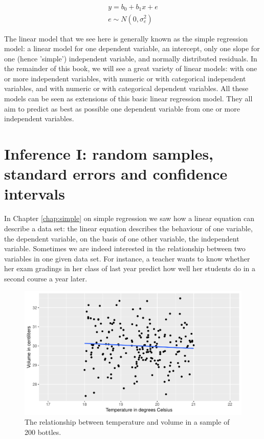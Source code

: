 \documentclass[]{book}\usepackage[]{graphicx}\usepackage[]{color}
\makeatletter
\def\maxwidth{ %
  \ifdim\Gin@nat@width>\linewidth
    \linewidth
  \else
    \Gin@nat@width
  \fi
}
\newenvironment{knitrout}{}{} %
\makeatother
\begin{document}
\begin{eqnarray}
y = b_0 + b_1 x + e \\
e \sim N(0,\sigma^2_e)
\end{eqnarray}


The linear model that we see here is generally known as the simple regression model: a linear model for one dependent variable, an intercept, only one slope for one (hence 'simple')  independent variable,  and normally distributed residuals. In the remainder of this book, we will see a great variety of linear models: with one or more independent variables, with numeric or with categorical independent variables, and with numeric or with categorical dependent variables. All these models can be seen as extensions of this basic linear regression model. They all aim to predict as best as possible one dependent variable from one or more independent variables. %





\chapter{Inference I: random samples, standard errors and confidence intervals}\label{chap:confidence}

In Chapter \ref{chap:simple} on simple regression we saw how a linear equation can describe a data set: the linear equation describes the behaviour of one variable, the dependent variable, on the basis of one other variable, the independent variable. Sometimes we are indeed interested in the relationship between two variables in one given data set. For instance, a teacher wants to know whether her exam gradings in her class of last year predict how well her students do in a second course a year later.

\begin{knitrout}
\color{fgcolor}\begin{figure}

{\centering \includegraphics[width=\maxwidth]{figure/inf_0-1} 

}

\caption[The relationship between temperature and volume in a sample of 200 bottles]{The relationship between temperature and volume in a sample of 200 bottles.}\label{fig:inf_0}
\end{figure}


\end{knitrout}
\end{document}
